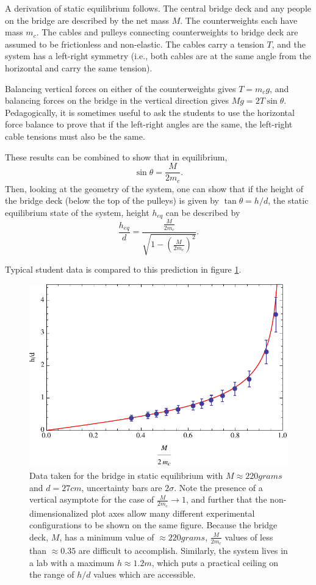 \documentclass[12pt]{iopart}
\newcommand{\be}{\begin{equation}}
\newcommand{\ee}{\end{equation}}
\begin{document}
A derivation of static equilibrium follows. The central bridge deck and any people on the bridge are described by the net mass $M$.  The counterweights each have mass $m_c$.  The cables and pulleys connecting counterweights to bridge deck are assumed to be frictionless and non-elastic.  The cables carry a tension $T$, and the system has a left-right symmetry (i.e., both cables are at the same angle from the horizontal and carry the same tension).

Balancing vertical forces on either of the counterweights gives 
$T=m_c g$, and balancing forces on the bridge in the vertical direction gives 
$M g = 2T \sin \theta$.
 Pedagogically, it is sometimes useful to ask the students to use the horizontal force balance to prove that if the left-right angles are the same, the left-right cable tensions must also be the same.
 
 These results can be combined to show that in equilibrium,
 \be
 \sin\theta =  \frac{M}{2 m_c}.
 \ee
 Then, looking at the geometry of the system, one can show that if the height of the bridge deck (below the top of the pulleys) is given by $\tan \theta=h/d$, the static equilibrium state of the system, height $h_{eq}$ can be described by
 \be
 \frac{h_{eq}}{d}=\frac{\frac{M}{2m_c}}{\sqrt{1-\left(\frac{M}{2m_c}\right)^2}}.
 \label{eq:equilib}
 \ee
 
Typical student data is compared to this prediction in figure \ref{fig:static_eq_data}.
 
\begin{figure}[h!]
\centering
\includegraphics[width=\columnwidth]{static_plot.pdf}  
\caption{Data taken for the bridge in static equilibrium with $M \approx 220grams$ and $d= 27cm$, uncertainty bars are $2\sigma$. Note the presence of a vertical asymptote for the case of $\frac{M}{2 m_c}\to1$, and further that the non-dimensionalized plot axes allow many different experimental configurations to be shown on the same figure.  Because the bridge deck, $M$, has a minimum value of $\approx220grams$, $\frac{M}{2m_c}$ values of less than $\approx0.35$ are difficult to accomplish.  Similarly, the system lives in a lab with a maximum $h\approx1.2m$, which puts a practical ceiling on the range of $h/d$ values which are accessible.}
\label{fig:static_eq_data}
\end{figure}
\end{document}
